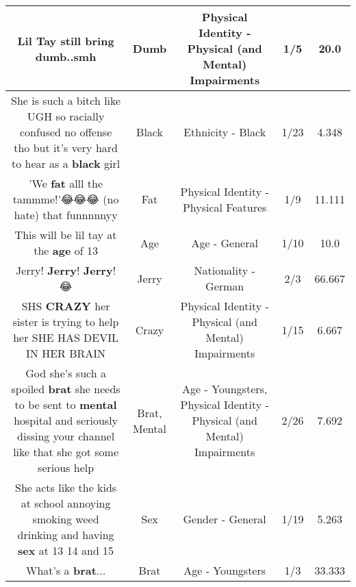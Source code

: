 \documentclass[11pt]{article}
\newlength\mylength
\begin{document}
\begin{center}
\begin{longtable}{|C{.65\mylength}|C{.30\mylength}|C{.12\mylength}|C{.12\mylength}|C{.12\mylength}|}
  \small Lil Tay still bring \textbf{dumb}..smh\normalsize   & Dumb & Physical Identity - Physical (and Mental) Impairments & 1/5 & 20.0 \\  \hline
  \small She is such a bitch like UGH so racially confused no offense tho but it's very hard to hear as a \textbf{black} girl\normalsize   & Black & Ethnicity - Black & 1/23 & 4.348 \\  \hline
  \small 'We \textbf{fat} alll the tammme!'😂😂😂 (no hate) that funnnnnyy\normalsize   & Fat & Physical Identity - Physical Features & 1/9 & 11.111 \\  \hline
  \small This will be lil tay at the \textbf{age} of 13\normalsize   & Age & Age - General & 1/10 & 10.0 \\  \hline
  \small Jerry! \textbf{Jerry}! \textbf{Jerry}!😂\normalsize   & Jerry & Nationality - German & 2/3 & 66.667 \\  \hline
  \small SHS \textbf{CRAZY} her sister is trying to help her SHE HAS DEVIL IN HER BRAIN\normalsize   & Crazy & Physical Identity - Physical (and Mental) Impairments & 1/15 & 6.667 \\  \hline
  \small God she's such a spoiled \textbf{brat} she needs to be sent to \textbf{mental} hospital and seriously dissing your channel like that she got some serious help\normalsize   & Brat, Mental & Age - Youngsters, Physical Identity - Physical (and Mental) Impairments & 2/26 & 7.692 \\  \hline
  \small She acts like the kids at school annoying smoking weed drinking and having \textbf{sex} at 13 14 and 15\normalsize   & Sex & Gender - General & 1/19 & 5.263 \\  \hline
  \small What's a \textbf{brat}...\normalsize   & Brat & Age - Youngsters & 1/3 & 33.333 \\  \hline

\end{longtable}
\end{center}
\end{document}

